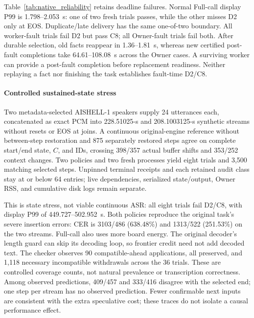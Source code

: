 Table~\ref{tab:native_reliability} retains deadline failures. Normal
Full-call display P99 is 1.798--2.053~s: one of two fresh trials passes,
while the other misses D2 only at EOS. Duplicate/late delivery has the
same one-of-two boundary. All worker-fault trials fail D2 but pass C8;
all Owner-fault trials fail both. After durable selection, old facts
reappear in 1.36--1.81~s, whereas new certified post-fault completions
take 64.61--108.08~s across the Owner cases. A surviving worker can
provide a post-fault completion before replacement readiness. Neither
replaying a fact nor finishing the task establishes fault-time D2/C8.

\paragraph{Controlled sustained-state stress}
Two metadata-selected AISHELL-1 speakers supply 24 utterances each,
concatenated as exact PCM into 228.51025-s and 208.1003125-s synthetic
streams without resets or EOS at joins. A continuous original-engine
reference without between-step restoration and 875 separately restored
steps agree on complete start/end state, $C$, and IDs, crossing 398/357
actual buffer shifts and 353/252 context changes. Two policies and two
fresh processes yield eight trials and 3,500 matching selected steps.
Unpinned terminal receipts and each retained audit class stay at or
below 64 entries; live dependencies, serialized state/output, Owner RSS,
and cumulative disk logs remain separate.

This is state stress, not viable continuous ASR: all eight trials fail
D2/C8, with display P99 of 449.727--502.952~s. Both policies reproduce
the original task's severe insertion errors: CER is 3103/486 (638.48\%)
and 1313/522 (251.53\%) on the two streams. Full-call also uses more
board energy. The original decoder's length guard can skip its decoding
loop, so frontier credit need not add decoded text. The checker observes
90 compatible-ahead applications, all preserved, and 1,118 necessary
incompatible withdrawals across the 36 trials. These are controlled
coverage counts, not natural prevalence or transcription correctness.
Among observed predictions, 409/457 and 333/416 disagree with the selected
end; one step per stream has no observed prediction. Fewer confirmable next inputs are consistent with the
extra speculative cost; these traces do not isolate a causal performance
effect.
